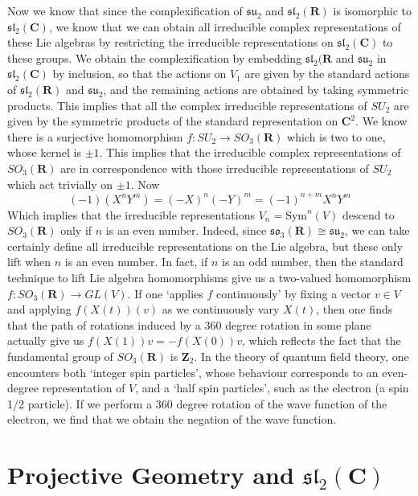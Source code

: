 Now we know that since the complexification of $\mathfrak{su}_2$ and $\mathfrak{sl}_2(\mathbf{R})$ is isomorphic to $\mathfrak{sl}_2(\mathbf{C})$, we know that we can obtain all irreducible complex representations of these Lie algebras by restricting the irreducible representations on $\mathfrak{sl}_2(\mathbf{C})$ to these groups. We obtain the complexification by embedding $\mathfrak{sl}_2(\mathbf{R}$ and $\mathfrak{su}_2$ in $\mathfrak{sl}_2(\mathbf{C})$ by inclusion, so that the actions on $V_1$ are given by the standard actions of $\mathfrak{sl}_2(\mathbf{R})$ and $\mathfrak{su}_2$, and the remaining actions are obtained by taking symmetric products. This implies that all the complex irreducible representations of $SU_2$ are given by the symmetric products of the standard representation on $\mathbf{C}^2$. We know there is a surjective homomorphism $f: SU_2 \to SO_3(\mathbf{R})$ which is two to one, whose kernel is $\pm 1$. This implies that the irreducible complex representations of $SO_3(\mathbf{R})$ are in correspondence with those irreducible representations of $SU_2$ which act trivially on $\pm 1$. Now
%
\[ (-1)(X^nY^m) = (-X)^n (-Y)^m = (-1)^{n+m}X^nY^m \]
%
Which implies that the irreducible representations $V_n = \text{Sym}^n(V)$ descend to $SO_3(\mathbf{R})$ only if $n$ is an even number. Indeed, since $\mathfrak{so}_3(\mathbf{R}) \cong \mathfrak{su}_2$, we can take certainly define all irreducible representations on the Lie algebra, but these only lift when $n$ is an even number. In fact, if $n$ is an odd number, then the standard technique to lift Lie algebra homomorphisms give us a two-valued homomorphism $f: SO_3(\mathbf{R}) \to GL(V)$. If one `applies $f$ continuously' by fixing a vector $v \in V$ and applying $f(X(t))(v)$ as we continuously vary $X(t)$, then one finds that the path of rotations induced by a 360 degree rotation in some plane actually give us $f(X(1))v = -f(X(0))v$, which reflects the fact that the fundamental group of $SO_3(\mathbf{R})$ is $\mathbf{Z}_2$. In the theory of quantum field theory, one encounters both `integer spin particles', whose behaviour corresponds to an even-degree representation of $V$, and a `half spin particles', such as the electron (a spin 1/2 particle). If we perform a 360 degree rotation of the wave function of the electron, we find that we obtain the negation of the wave function.

\section{Projective Geometry and $\mathfrak{sl}_2(\mathbf{C})$}

